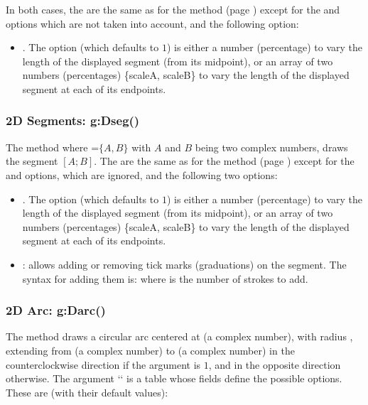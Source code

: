 In both cases, the  are the same as for the  method (page \pageref{dec:dpolyline}) except for the  and  options which are not taken into account, and the following option:
\begin{itemize}
    \item {}. The option  (which defaults to $1$) is either a number (percentage) to vary the length of the displayed segment (from its midpoint), or an array of two numbers (percentages) \{scaleA, scaleB\} to vary the length of the displayed segment at each of its endpoints.
\end{itemize}

\subsubsection{2D Segments: g:Dseg()}

The method  where =$\{A,B\}$ with $A$ and $B$ being two complex numbers, draws the segment $[A;B]$. The  are the same as for the  method (page \pageref{dec:dpolyline}) except for the  and  options, which are ignored, and the following two options:
\begin{itemize}
    \item {}. The option  (which defaults to $1$) is either a number (percentage) to vary the length of the displayed segment (from its midpoint), or an array of two numbers (percentages) \{scaleA, scaleB\} to vary the length of the displayed segment at each of its endpoints.
    
    \item {}: allows adding or removing tick marks (graduations) on the segment. The syntax for adding them is:  where  is the number of strokes to add.
\end{itemize}


\subsubsection{2D Arc: g:Darc()}

The  method draws a circular arc centered at  (a complex number), with radius , extending from  (a complex number) to  (a complex number) in the counterclockwise direction if the argument  is $1$, and in the opposite direction otherwise. The argument `` is a table whose fields define the possible options. These are (with their default values):

